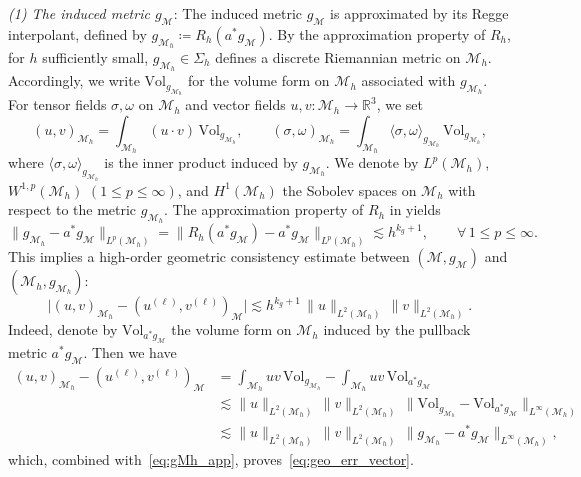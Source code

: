 \documentclass[11pt,a4paper,oneside,reqno]{amsart}
\theoremstyle{definition}
\theoremstyle{plain}
\numberwithin{theorem}{section}
\numberwithin{proposition}{section}
\numberwithin{lemma}{section}
\numberwithin{equation}{section}
\newcommand{\Man}{\mathcal{M}}
\newcommand{\Vol}{\mathrm{Vol}}
\begin{document}
\textit{(1) The induced metric \(g_{\Man}\)}:
The induced metric \(g_{\Man}\) is approximated by its Regge interpolant, defined by
\(g_{\Man_h} \coloneqq R_h(a^* g_{\Man})\).
By the approximation property of \(R_h\), for \(h\) sufficiently small,
\(g_{\Man_h}\in\Sigma_h\) defines a discrete Riemannian metric on \(\Man_h\). 
Accordingly, we write \(\Vol_{g_{\Man_h}}\) for the volume form on \(\Man_h\) associated with \(g_{\Man_h}\). For tensor fields \(\sigma,\omega\) on \(\Man_h\) and vector fields \(u,v: \Man_h\to\mathbb R^3\), we set
\begin{equation}\label{eq:inner_Mh} 
(u,v)_{\Man_h} = \int_{\Man_h} (u\cdot v)\,\Vol_{g_{\Man_h}},
\qquad
(\sigma,\omega)_{\Man_h} = \int_{\Man_h} \langle \sigma,\omega\rangle_{g_{\Man_h}}\,\Vol_{g_{\Man_h}},
\end{equation} 
where \(\langle \sigma,\omega\rangle_{g_{\Man_h}}\) is the inner product induced by \(g_{\Man_h}\).
We denote by \(L^p(\Man_h)\), \(W^{1,p}(\Man_h)\) \((1\le p\le\infty)\), and \(H^1(\Man_h)\) the Sobolev spaces on \(\Man_h\) with respect to the metric \(g_{\Man_h}\).
The approximation property of \(R_h\) in \cite[Theorem~2.5]{li2018regge} yields
\begin{equation}\label{eq:gMh_app}
\|g_{\Man_h}-a^*g_{\Man}\|_{L^p(\Man_h)} = 
\|R_h(a^*g_{\Man})-a^*g_{\Man}\|_{L^p(\Man_h)}
\lesssim h^{k_g+1}, \qquad \forall\, 1\le p\le\infty .
\end{equation}
This implies a high-order geometric consistency estimate between 
$(\Man,g_{\Man})$ and $(\Man_h,g_{\Man_h})$:
\begin{equation}\label{eq:geo_err_vector}
\big|(u,v)_{\Man_h} - (u^{(\ell)},v^{(\ell)})_{\Man}\big|
\lesssim h^{k_g+1}\,\|u\|_{L^2(\Man_h)}\,\|v\|_{L^2(\Man_h)}.
\end{equation}
Indeed, denote by $\Vol_{a^*g_{\Man}}$ the volume form on $\Man_h$ induced by the 
pullback metric $a^*g_{\Man}$. Then we have
\[
\begin{aligned}
    (u,v)_{\Man_h} - (u^{(\ell)},v^{(\ell)})_{\Man}
    &= \int_{\Man_h} u v\,\Vol_{g_{\Man_h}}
     - \int_{\Man_h} u v\,\Vol_{a^*g_{\Man}} \\
    &\lesssim \|u\|_{L^2(\Man_h)}\,\|v\|_{L^2(\Man_h)}\,
        \|\Vol_{g_{\Man_h}} - \Vol_{a^*g_{\Man}}\|_{L^{\infty}(\Man_h)} \\
    &\lesssim \|u\|_{L^2(\Man_h)}\,\|v\|_{L^2(\Man_h)}\,
        \|g_{\Man_h} - a^*g_{\Man}\|_{L^{\infty}(\Man_h)},
\end{aligned}
\]
which, combined with~\eqref{eq:gMh_app}, proves~\eqref{eq:geo_err_vector}.
\end{document}
